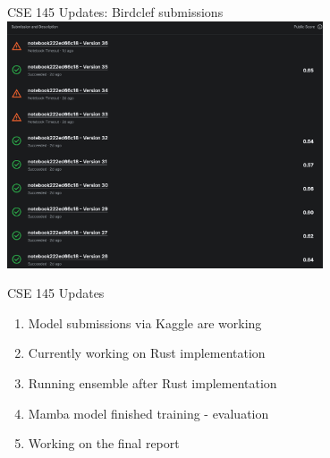 

\begin{frame}{CSE 145 Updates: Birdclef submissions}
    \centering
    \includegraphics[height=0.7\textheight,width=0.7\textwidth,keepaspectratio]{images/Birdclef_submissions.png}
\end{frame}

\begin{frame}{CSE 145 Updates}
    \begin{enumerate}
        \item Model submissions via Kaggle are working
        \item Currently working on Rust implementation
        \item Running ensemble after Rust implementation
        \item Mamba model finished training - evaluation
        \item Working on the final report
    \end{enumerate}
\end{frame}



